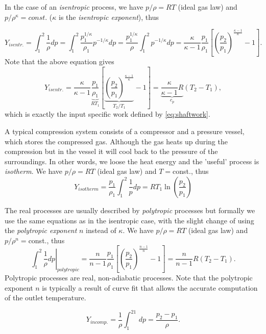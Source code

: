 In the case of an \emph{isentropic} process, we have $p/\rho=RT$ (ideal gas law) and $p/\rho^\kappa=const.$ ($\kappa$ is the \emph{isentropic exponent}), thus

\begin{equation}
Y_{isentr.}= \int_1^2 \frac{1}{\rho} dp = \int_1^2 \frac{p_1^{1/\kappa}}{\rho_1} p^{-1/\kappa}dp = \frac{p_1^{1/\kappa}}{\rho}\int_1^2 p^{-1/\kappa} dp = \frac{\kappa}{\kappa-1}\frac{p_1}{\rho_1} \left[\left(\frac{p_2}{p_1}\right)^{\frac{\kappa-1}{\kappa}}-1\right].
\end{equation}
%
Note that the above equation gives
\begin{equation}
Y_{isentr.}= \frac{\kappa}{\kappa-1}\underbrace{\frac{p_1}{\rho_1}}_{R T_1} \left[\underbrace{\left(\frac{p_2}{p_1}\right)^{\frac{\kappa-1}{\kappa}}}_{T_2/T_1}-1\right] = \underbrace{\frac{\kappa}{\kappa-1} R }_{c_p}\left(T_2-T_1\right),
\end{equation}
%
which is exactly the input specific work defined by \eqref{eq:shaftwork}.

A typical compression system consists of a compressor and a pressure vessel, which stores the compressed gas. Although the gas heats up during the compression but in the vessel it will cool back to the pressure of the surroundings. In other words, we loose the heat energy and the 'useful' process is \emph{isotherm}. We have $p/\rho=RT$ (ideal gas law) and $T=$const., thus
%
\begin{equation}
Y_{isotherm}=\frac{p_1}{\rho_1}\int_1^2\frac{1}{p}dp = R T_1 \ln\left( \frac{p_2}{p_1}\right)
\end{equation}

The real processes are usually described by \emph{polytropic} processes but formally we use the same equations as in the isentropic case, with the slight change of using the \emph{polytropic exponent} $n$ instead of $\kappa$. We have $p/\rho=RT$ (ideal gas law) and $p/\rho^n=$const., thus
%
\begin{equation}
\left.\int_1^2\frac{1}{\rho}dp\right|_{polytropic} = \frac{n}{n-1}\frac{p_1}{\rho_1} \left[\left(\frac{p_2}{p_1}\right)^{\frac{n-1}{n}}-1\right]=\frac{n}{n-1} R \left( T_2-T_1\right).
\label{eq:chap1_polytropic_specific_work}
\end{equation}
%
Polytropic processes are real, non-adiabatic processes. Note that the polytropic exponent $n$ is typically a result of curve fit that allows the accurate computation of the outlet temperature.

\begin{equation}
Y_{incomp.}=\frac{1}{\rho}\int_1^21\,dp =\frac{p_2-p_1}{\rho}.
\end{equation}


